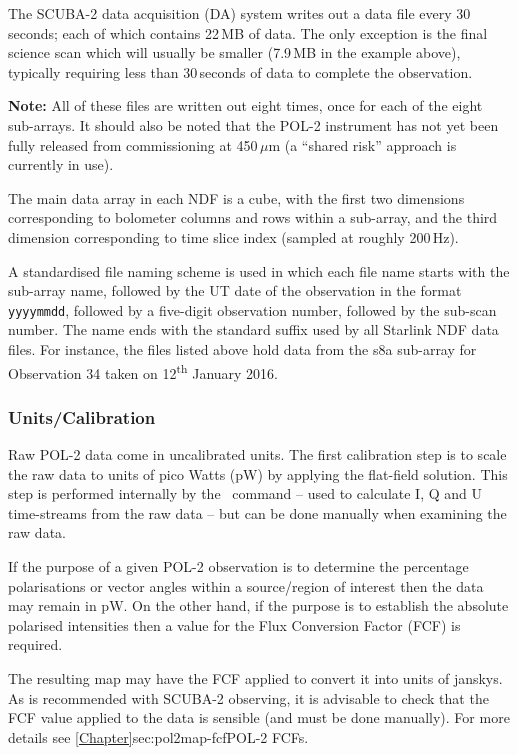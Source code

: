 The SCUBA-2 data acquisition (DA) system writes out a data file every
30\,seconds; each of which contains 22\,MB of data. The only exception
is the final science scan which will usually be smaller (7.9\,MB in
the example above), typically requiring less than 30\,seconds of data
to complete the observation.

\textbf{Note:} All of these files are written out eight times, once
for each of the eight sub-arrays. It should also be noted that the
POL-2 instrument has not yet been fully released from commissioning at
450\,$\mu$m (a ``shared risk'' approach is currently in use).

The main data array in each NDF is a cube, with the first two
dimensions corresponding to bolometer columns and rows within a
sub-array, and the third dimension corresponding to time slice index
(sampled at roughly 200\,Hz).

A standardised file naming scheme is used in which each file name
starts with the sub-array name, followed by the UT date of the
observation in the format \texttt{yyyymmdd}, followed by a five-digit
observation number, followed by the sub-scan number. The name ends
with the standard suffix  used by all Starlink NDF data
files. For instance, the files listed above hold data from the s8a
sub-array for Observation 34 taken on 12\textsuperscript{th} January
2016.




\subsubsection*{Units/Calibration}

Raw POL-2 data come in uncalibrated units. The first calibration step
is to scale the raw data to units of pico Watts (pW) by applying the
flat-field solution. This step is performed internally by the \SMURF\
command  -- used to calculate
I, Q and U time-streams from the
raw data -- but can be done manually when examining the raw data.

If the purpose of a given POL-2 observation is to determine the
percentage polarisations or vector angles within a source/region of
interest then the data may remain in pW. On the other hand, if the
purpose is to establish the absolute polarised intensities then a
value for the Flux Conversion Factor (FCF) is required.

The resulting map may have the FCF applied to convert it into units of
janskys. As is recommended with SCUBA-2 observing, it is advisable to
check that the FCF value applied to the data is sensible (and must be
done manually). For more details see
\cref{Chapter}{sec:pol2map-fcf}{POL-2 FCFs}.





